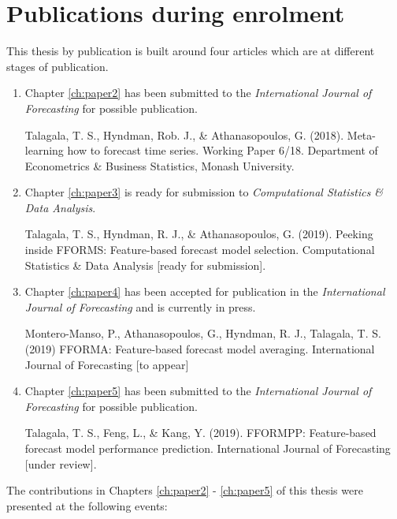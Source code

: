 \documentclass{monashthesis}
\begin{document}
\hypertarget{publications-during-enrolment}{%
\chapter*{Publications during enrolment}\label{publications-during-enrolment}}

This thesis by publication is built around four articles which are at different stages of publication.

\begin{enumerate}
\def\labelenumi{\arabic{enumi}.}
\item
  Chapter \ref{ch:paper2} has been submitted to the \emph{International Journal of Forecasting} for possible publication.

  Talagala, T. S., Hyndman, Rob. J., \& Athanasopoulos, G. (2018). Meta-learning how to forecast time series. Working Paper 6/18. Department of Econometrics \& Business Statistics, Monash University.
\item
  Chapter \ref{ch:paper3} is ready for submission to \emph{Computational Statistics \& Data Analysis}.

  Talagala, T. S., Hyndman, R. J., \& Athanasopoulos, G. (2019). Peeking inside FFORMS: Feature-based forecast model selection. Computational Statistics \& Data Analysis {[}ready for submission{]}.
\item
  Chapter \ref{ch:paper4} has been accepted for publication in the \emph{International Journal of Forecasting} and is currently in press.

  Montero-Manso, P., Athanasopoulos, G., Hyndman, R. J., Talagala, T. S. (2019) FFORMA: Feature-based forecast model averaging. International Journal of Forecasting {[}to appear{]}
\item
  Chapter \ref{ch:paper5} has been submitted to the \emph{International Journal of Forecasting} for possible publication.

  Talagala, T. S., Feng, L., \& Kang, Y. (2019). FFORMPP: Feature-based forecast model performance prediction. International Journal of Forecasting {[}under review{]}.
\end{enumerate}

The contributions in Chapters \ref{ch:paper2} - \ref{ch:paper5} of this thesis were presented at the following events:
\end{document}
